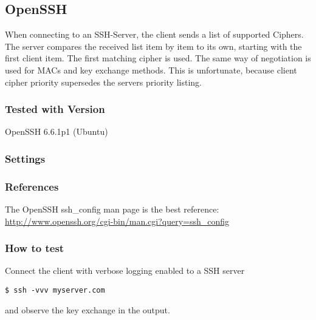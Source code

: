 \subsection{OpenSSH}
When connecting to an SSH-Server, the client sends a list of supported Ciphers. The server compares the received list item by item to its own, starting with the first client item.
The first matching cipher is used. The same way of negotiation is used for MACs and key exchange methods.
This is unfortunate, because client cipher priority supersedes the servers priority listing.

\subsubsection{Tested with Version} OpenSSH 6.6.1p1 (Ubuntu)
\subsubsection{Settings}

\subsubsection{References}
The OpenSSH ssh\_config  man page is the best reference: \url{http://www.openssh.org/cgi-bin/man.cgi?query=ssh_config}

\subsubsection{How to test}
Connect the client with verbose logging enabled to a SSH server
\begin{lstlisting}
$ ssh -vvv myserver.com
\end{lstlisting}and observe the key exchange in the output.

